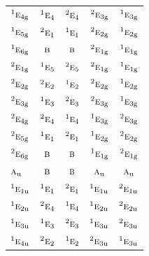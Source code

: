 \documentclass[10pt,a4paper]{article}
\numberwithin{equation}{section}
\newcommand{\irr}[1]{\text{\normalfont\scshape #1}}
\newcommand{\conjpair}[1]{{}^{#1}}
\newcommand{\ptag}[1]{\mathrm{#1}}
\begin{document}
{\begin{longtable}{@{}lcccc@{}}
$\conjpair{1}\irr{e}_{4\ptag{g}}$ & $\conjpair{1}\irr{e}_{4}$ & $\conjpair{2}\irr{e}_{4}$ & $\conjpair{2}\irr{e}_{3\ptag{g}}$ & $\conjpair{1}\irr{e}_{3\ptag{g}}$\\
$\conjpair{1}\irr{e}_{5\ptag{g}}$ & $\conjpair{2}\irr{e}_{1}$ & $\conjpair{1}\irr{e}_{1}$ & $\conjpair{2}\irr{e}_{2\ptag{g}}$ & $\conjpair{1}\irr{e}_{2\ptag{g}}$\\
$\conjpair{1}\irr{e}_{6\ptag{g}}$ & $\irr{b}$ & $\irr{b}$ & $\conjpair{2}\irr{e}_{1\ptag{g}}$ & $\conjpair{1}\irr{e}_{1\ptag{g}}$\\
$\conjpair{2}\irr{e}_{1\ptag{g}}$ & $\conjpair{1}\irr{e}_{5}$ & $\conjpair{2}\irr{e}_{5}$ & $\conjpair{2}\irr{e}_{1\ptag{g}}$ & $\conjpair{1}\irr{e}_{1\ptag{g}}$\\
$\conjpair{2}\irr{e}_{2\ptag{g}}$ & $\conjpair{2}\irr{e}_{2}$ & $\conjpair{1}\irr{e}_{2}$ & $\conjpair{2}\irr{e}_{2\ptag{g}}$ & $\conjpair{1}\irr{e}_{2\ptag{g}}$\\
$\conjpair{2}\irr{e}_{3\ptag{g}}$ & $\conjpair{1}\irr{e}_{3}$ & $\conjpair{2}\irr{e}_{3}$ & $\conjpair{2}\irr{e}_{3\ptag{g}}$ & $\conjpair{1}\irr{e}_{3\ptag{g}}$\\
$\conjpair{2}\irr{e}_{4\ptag{g}}$ & $\conjpair{2}\irr{e}_{4}$ & $\conjpair{1}\irr{e}_{4}$ & $\conjpair{1}\irr{e}_{3\ptag{g}}$ & $\conjpair{2}\irr{e}_{3\ptag{g}}$\\
$\conjpair{2}\irr{e}_{5\ptag{g}}$ & $\conjpair{1}\irr{e}_{1}$ & $\conjpair{2}\irr{e}_{1}$ & $\conjpair{1}\irr{e}_{2\ptag{g}}$ & $\conjpair{2}\irr{e}_{2\ptag{g}}$\\
$\conjpair{2}\irr{e}_{6\ptag{g}}$ & $\irr{b}$ & $\irr{b}$ & $\conjpair{1}\irr{e}_{1\ptag{g}}$ & $\conjpair{2}\irr{e}_{1\ptag{g}}$\\
$\irr{a}_{\ptag{u}}$ & $\irr{b}$ & $\irr{b}$ & $\irr{a}_{\ptag{u}}$ & $\irr{a}_{\ptag{u}}$\\
$\conjpair{1}\irr{e}_{1\ptag{u}}$ & $\conjpair{1}\irr{e}_{1}$ & $\conjpair{2}\irr{e}_{1}$ & $\conjpair{1}\irr{e}_{1\ptag{u}}$ & $\conjpair{2}\irr{e}_{1\ptag{u}}$\\
$\conjpair{1}\irr{e}_{2\ptag{u}}$ & $\conjpair{2}\irr{e}_{4}$ & $\conjpair{1}\irr{e}_{4}$ & $\conjpair{1}\irr{e}_{2\ptag{u}}$ & $\conjpair{2}\irr{e}_{2\ptag{u}}$\\
$\conjpair{1}\irr{e}_{3\ptag{u}}$ & $\conjpair{1}\irr{e}_{3}$ & $\conjpair{2}\irr{e}_{3}$ & $\conjpair{1}\irr{e}_{3\ptag{u}}$ & $\conjpair{2}\irr{e}_{3\ptag{u}}$\\
$\conjpair{1}\irr{e}_{4\ptag{u}}$ & $\conjpair{2}\irr{e}_{2}$ & $\conjpair{1}\irr{e}_{2}$ & $\conjpair{2}\irr{e}_{3\ptag{u}}$ & $\conjpair{1}\irr{e}_{3\ptag{u}}$\\

\end{longtable}}
\end{document}
